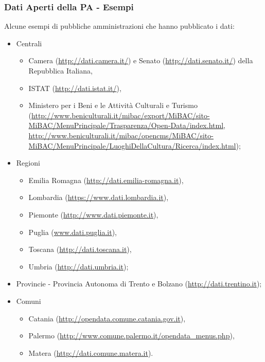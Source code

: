 \documentclass[8pt]{beamer}
\begin{document}
\begin{frame}
\frametitle{Dati Aperti della PA - Esempi}
Alcune esempi di pubbliche amministrazioni che hanno pubblicato i dati:
\vspace{\baselineskip}

\begin{itemize}
 \item Centrali
 \begin{itemize}
  \item Camera (\url{http://dati.camera.it/}) e Senato (\url{http://dati.senato.it/}) della Repubblica Italiana,
  \item ISTAT (\url{http://dati.istat.it/}),  
  \item Ministero per i Beni e le Attivit\`a Culturali e Turismo (\url{http://www.beniculturali.it/mibac/export/MiBAC/sito-MiBAC/MenuPrincipale/Trasparenza/Open-Data/index.html}, \url{http://www.beniculturali.it/mibac/opencms/MiBAC/sito-MiBAC/MenuPrincipale/LuoghiDellaCultura/Ricerca/index.html});  
 \end{itemize}
 \item Regioni
 \begin{itemize}
  \item Emilia Romagna (\url{http://dati.emilia-romagna.it}),
  \item Lombardia (\url{https://www.dati.lombardia.it}), 
  \item Piemonte (\url{http://www.dati.piemonte.it}), 
  \item Puglia (\url{www.dati.puglia.it}),
  \item Toscana (\url{http://dati.toscana.it}), 
  \item Umbria (\url{http://dati.umbria.it});
 \end{itemize}
 \item Provincie - Provincia Autonoma di Trento e Bolzano (\url{http://dati.trentino.it});
 \item Comuni
 \begin{itemize}
  \item Catania (\url{http://opendata.comune.catania.gov.it}),
  \item Palermo (\url{http://www.comune.palermo.it/opendata_menus.php}),
  \item Matera (\url{http://dati.comune.matera.it}).
 \end{itemize}
\end{itemize}
\end{frame}
\end{document}
